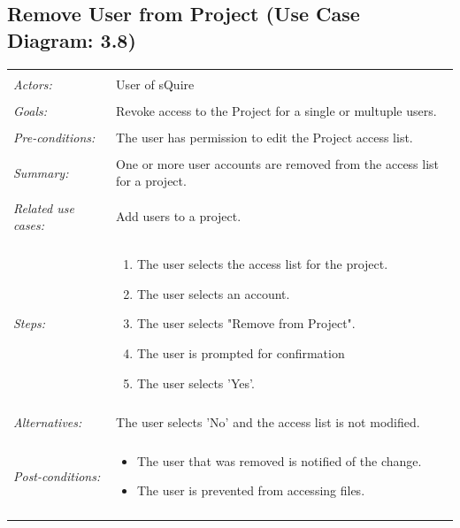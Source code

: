 \documentclass[11pt]{report}
\begin{document}
\subsection{Remove User from Project (Use Case Diagram: 3.8)}
\begin{tabular}{ p{2cm} p{12cm} }   
 \hline
 \\
 \textit{Actors:} & User of sQuire \\
 \\
 \textit{Goals:} & Revoke access to the Project for a single or multuple users. \\
 \\
 \textit{Pre-conditions:} & The user has permission to edit the Project access list. \\
 \\
 \textit{Summary:} & One or more user accounts are removed from the access list for a project. \\ 
 \\
 \textit{Related use cases:} & Add users to a project.  \\ 
 \\
 \textit{Steps:} & \begin{enumerate}
  \item The user selects the access list for the project.
	 \item The user selects an account. 
	 \item The user selects "Remove from Project".
	 \item The user is prompted for confirmation
	 \item The user selects 'Yes'.
 \end{enumerate} \\
 \\
 \textit{Alternatives:} & The user selects 'No' and the access list is not modified. \\
 \\
 \textit{Post-conditions:} &
    \begin{itemize}
	 \item The user that was removed is notified of the change.
	 \item The user is prevented from accessing files.
    \end{itemize}\\
 \\
\hline
\end{tabular}
\end{document}
